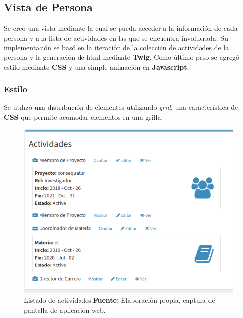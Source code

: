 
\subsection{Vista de Persona}
\label{sub:vista_persona}
Se creó una vista mediante la cual se pueda acceder a la información de cada persona y a la lista de actividades en las que se encuentra involucrada. Su
implementación se basó en la iteración de la colección de actividades  de la persona y la generación de html mediante \textbf{Twig}\@.
Como último paso se agregó estilo mediante \textbf{CSS} y una simple animación en \textbf{Javascript}.


\subsubsection{Estilo}%
\label{ssub:estilo}

Se utilizó una distribución de elementos utilizando \textit{grid}, una característica de \textbf{CSS} que permite acomodar elementos en una grilla.





\begin{figure}[h]
    \includegraphics[width=1\linewidth]{image/vista_persona.png}
    \caption{Listado de actividades.\newline \textbf{Fuente:} Elaboración propia, captura de pantalla de aplicación web.}
    \label{fig:image/vista_persona}
\end{figure}


